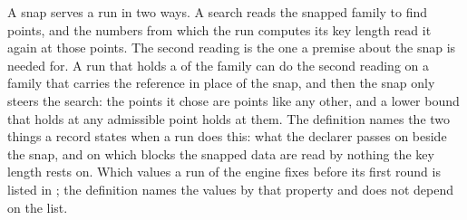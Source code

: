 
A snap serves a run in two ways. A search reads the snapped family to find
points, and the numbers from which the run computes its key length read it
again at those points. The second reading is the one a premise about the snap
is needed for. A run that holds a  of the family can do the
second reading on a family that carries the reference in place of the snap,
and then the snap only steers the search: the points it chose are points like
any other, and a lower bound that holds at any admissible point holds at
them. The definition names the two things a record states when a run does
this: what the declarer passes on beside the snap, and on which blocks the
snapped data are read by nothing the key length rests on. Which values a
run of the engine fixes before its first round is listed in
; the definition names the values by that property
and does not depend on the list.

